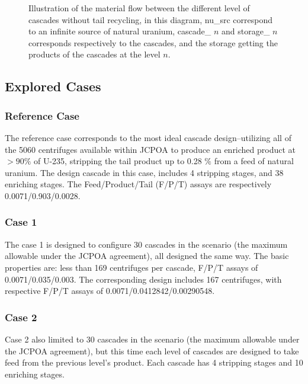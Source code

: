 \documentclass{anstrans}
\begin{document}
\begin{figure}[ht]
  \caption{Illustration of the material flow between the different level of
      cascades without tail recycling, in this diagram, nu\_src correspond to an
      infinite source of natural uranium, cascade\_ $n$ and storage\_ $n$
      corresponds respectively to the cascades, and the storage getting the
  products of the cascades at the level $n$.}\label{fig:flow}
\end{figure}

\subsection{Explored Cases}
\subsubsection{Reference Case}

The reference case corresponds to the most ideal cascade design--utilizing all
of the 5060 centrifuges available within JCPOA to produce an enriched product at
$>90\%$ of U-235, stripping the tail product up to 0.28 $\%$ from a feed of
natural uranium.  The design cascade in this case, includes 4 stripping stages,
and 38 enriching stages. The Feed/Product/Tail (F/P/T) assays are respectively
0.0071/0.903/0.0028.

\subsubsection{Case 1}

The case 1 is designed to configure 30 cascades in the scenario (the maximum
allowable under the JCPOA agreement), all designed the same way. The basic
properties are: less than 169 centrifuges per cascade, F/P/T assays of
0.0071/0.035/0.003. The corresponding design includes 167 centrifuges, with
respective F/P/T assays of 0.0071/0.0412842/0.00290548.

\subsubsection{Case 2}

Case 2 also limited to 30 cascades in the scenario (the maximum allowable under
the JCPOA agreement), but this time each level of cascades are designed to take
feed from the previous level's product. Each cascade has 4 stripping stages and
10 enriching stages.
\end{document}
